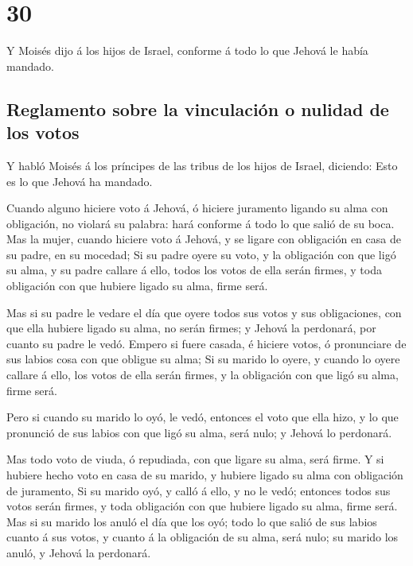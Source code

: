 \hypertarget{section-29}{%
\section{30}\label{section-29}}

 Y Moisés dijo á los hijos de Israel, conforme á todo lo
que Jehová le había mandado.

\hypertarget{reglamento-sobre-la-vinculaciuxf3n-o-nulidad-de-los-votos}{%
\subsection{Reglamento sobre la vinculación o nulidad de los
votos}\label{reglamento-sobre-la-vinculaciuxf3n-o-nulidad-de-los-votos}}

 Y habló Moisés á los príncipes de las tribus de los hijos
de Israel, diciendo: Esto es lo que Jehová ha mandado.

 Cuando alguno hiciere voto á Jehová, ó hiciere juramento
ligando su alma con obligación, no violará su palabra: hará conforme á
todo lo que salió de su boca.  Mas la mujer, cuando
hiciere voto á Jehová, y se ligare con obligación en casa de su padre,
en su mocedad;  Si su padre oyere su voto, y la obligación
con que ligó su alma, y su padre callare á ello, todos los votos de ella
serán firmes, y toda obligación con que hubiere ligado su alma, firme
será.

 Mas si su padre le vedare el día que oyere todos sus
votos y sus obligaciones, con que ella hubiere ligado su alma, no serán
firmes; y Jehová la perdonará, por cuanto su padre le vedó.
 Empero si fuere casada, é hiciere votos, ó pronunciare de
sus labios cosa con que obligue su alma;  Si su marido lo
oyere, y cuando lo oyere callare á ello, los votos de ella serán firmes,
y la obligación con que ligó su alma, firme será.

 Pero si cuando su marido lo oyó, le vedó, entonces el
voto que ella hizo, y lo que pronunció de sus labios con que ligó su
alma, será nulo; y Jehová lo perdonará.

 Mas todo voto de viuda, ó repudiada, con que ligare su
alma, será firme.  Y si hubiere hecho voto en casa de su
marido, y hubiere ligado su alma con obligación de juramento,
 Si su marido oyó, y calló á ello, y no le vedó; entonces
todos sus votos serán firmes, y toda obligación con que hubiere ligado
su alma, firme será.  Mas si su marido los anuló el día
que los oyó; todo lo que salió de sus labios cuanto á sus votos, y
cuanto á la obligación de su alma, será nulo; su marido los anuló, y
Jehová la perdonará.

